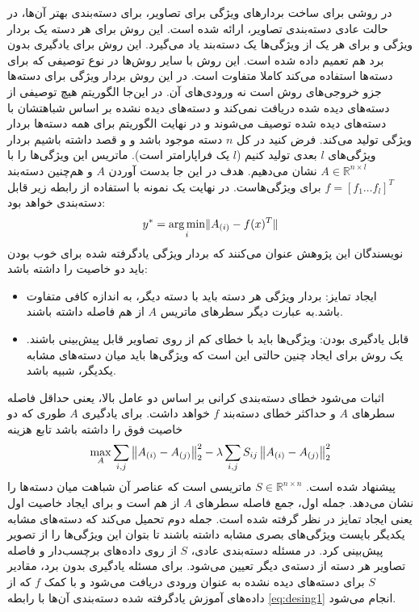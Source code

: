  
 در \cite{Yu2013} روشی برای ساخت بردارهای ویژگی برای تصاویر، برای دسته‌بندی بهتر آن‌ها، در حالت عادی دسته‌بندی تصاویر، ارائه شده است. این روش برای هر دسته یک بردار ویژگی و برای هر یک از ويژگی‌ها یک دسته‌بند یاد می‌گیرد. 
  این روش برای یادگیری بدون برد هم تعمیم داده شده است. این روش با سایر روش‌ها در نوع توصیفی که برای دسته‌ها استفاده می‌کند کاملا متفاوت است. در این روش بردار ویژگی برای دسته‌ها جزو خروجی‌های روش است نه ورودی‌های آن. در این‌جا الگوریتم هیچ توصیفی از دسته‌های دیده شده دریافت نمی‌کند و دسته‌های دیده نشده بر اساس شباهتشان با دسته‌های دیده شده توصیف می‌شوند و در نهایت الگوریتم برای همه دسته‌ها بردار ویژگی تولید می‌کند. فرض کنید در کل $n$ دسته موجود باشد و و قصد داشته باشیم بردار ویژگی‌های $l$ بعدی تولید کنیم ($l$ یک فراپارامتر است). ماتریس این ويژگی‌ها را با 
  $ A \in \mathbb{R}^{n \times l}$
  نشان می‌دهیم. هدف در این جا بدست آوردن $A$ و هم‌چنین دسته‌بند
$f = [f_1 \ldots f_l]^T$
   برای ویژگی‌هاست. در نهایت یک نمونه با استفاده از رابطه زیر قابل دسته‌بندی خواهد بود:
 \begin{equation}
 \label{eq:desing1}
 y^* = \operatorname*{arg\,min}_i \lVert A_{(i)} - f(x)^T \rVert
 \end{equation}
 نویسندگان این پژوهش عنوان می‌کنند که بردار ویژگی یادگرفته شده برای خوب بودن باید دو خاصیت را داشته باشد:
 \begin{itemize}
 \item 
 ایجاد تمایز: بردار ویژگی هر دسته باید با دسته دیگر، به اندازه کافی متفاوت باشد.به عبارت دیگر سطرهای ماتریس $A$ از هم فاصله داشته باشند.
 \item
 قابل یادگیری بودن: ویژگی‌ها باید با خطای کم از روی تصاویر قابل پیش‌بینی باشند. یک روش برای ایجاد چنین حالتی این است که ویژگی‌ها باید میان دسته‌های مشابه یکدیگر، شبیه باشد.
 \end{itemize}
اثبات می‌شود خطای دسته‌بندی کرانی بر اساس دو عامل بالا، یعنی حداقل فاصله سطرهای $A$ و حداکثر خطای دسته‌بند $f$ خواهد داشت. 
برای یادگیری $A$ طوری که دو خاصیت فوق را داشته باشد تابع هزینه 
\begin{equation}
\label{eq:design2}
\max_A \sum_{i,j} \left \lVert A_{(i)} - A_{(j)} \right \rVert_2^2 - \lambda \sum_{i,j} S_{ij} \left \lVert A_{(i)} - A_{(j)} \right \rVert_2^2
\end{equation}
پیشنهاد شده است.
$ S \in \mathbb{R}^{n \times n}$
 ماتریسی است که عناصر آن شباهت میان دسته‌ها را نشان می‌دهد. جمله اول، جمع فاصله سطرهای $A$ از هم است و  برای ایجاد خاصیت اول یعنی ایجاد تمایز در نظر گرفته شده است. جمله دوم تحمیل می‌کند که دسته‌های مشابه یکدیگر بایست ویژگی‌های بصری مشابه داشته باشند تا بتوان این ویژگی‌ها را از تصویر پیش‌بینی کرد. 
 در مسئله دسته‌بندی عادی، $S$ از روی داده‌های برچسب‌دار و  فاصله تصاویر هر دسته از دسته‌ی دیگر تعیین می‌شود. برای مسئله یادگیری بدون برد، مقادیر $S$ برای دسته‌های دیده نشده به عنوان ورودی دریافت می‌شود و با کمک $f$ که از داده‌های آموزش یادگرفته شده دسته‌بندی آن‌ها با رابطه 
 \eqref{eq:desing1}
  انجام می‌شود.


